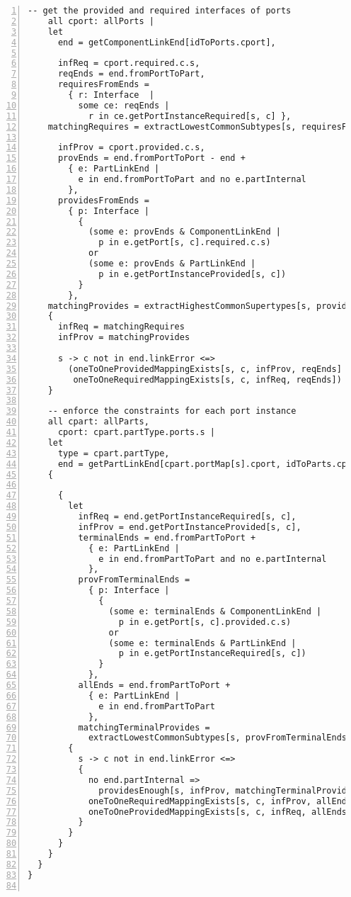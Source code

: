\begin{lstlisting}[caption={port\_inference.als}, numbers=left]
    -- get the provided and required interfaces of ports
    all cport: allPorts |
    let
      end = getComponentLinkEnd[idToPorts.cport],
      
      infReq = cport.required.c.s,
      reqEnds = end.fromPortToPart,
      requiresFromEnds =
        { r: Interface  |
          some ce: reqEnds |
            r in ce.getPortInstanceRequired[s, c] },
    matchingRequires = extractLowestCommonSubtypes[s, requiresFromEnds],
      
      infProv = cport.provided.c.s,
      provEnds = end.fromPortToPort - end +
        { e: PartLinkEnd |
          e in end.fromPortToPart and no e.partInternal
        },
      providesFromEnds =
        { p: Interface |
          {
            (some e: provEnds & ComponentLinkEnd |
              p in e.getPort[s, c].required.c.s)
            or
            (some e: provEnds & PartLinkEnd |
              p in e.getPortInstanceProvided[s, c])
          }
        },
    matchingProvides = extractHighestCommonSupertypes[s, providesFromEnds]
    {
      infReq = matchingRequires
      infProv = matchingProvides

      s -> c not in end.linkError <=>
        (oneToOneProvidedMappingExists[s, c, infProv, reqEnds] and
         oneToOneRequiredMappingExists[s, c, infReq, reqEnds])
    }

    -- enforce the constraints for each port instance
    all cpart: allParts,
      cport: cpart.partType.ports.s |
    let
      type = cpart.partType,
      end = getPartLinkEnd[cpart.portMap[s].cport, idToParts.cpart]
    {
      
      {
        let
          infReq = end.getPortInstanceRequired[s, c],        
          infProv = end.getPortInstanceProvided[s, c],
          terminalEnds = end.fromPartToPort +
            { e: PartLinkEnd |
              e in end.fromPartToPart and no e.partInternal
            },
          provFromTerminalEnds =
            { p: Interface |
              {
                (some e: terminalEnds & ComponentLinkEnd |
                  p in e.getPort[s, c].provided.c.s)
                or
                (some e: terminalEnds & PartLinkEnd |
                  p in e.getPortInstanceRequired[s, c])
              }
            },
          allEnds = end.fromPartToPort +
            { e: PartLinkEnd |
              e in end.fromPartToPart
            },
          matchingTerminalProvides =
            extractLowestCommonSubtypes[s, provFromTerminalEnds]
        {
          s -> c not in end.linkError <=>
          {
            no end.partInternal =>
              providesEnough[s, infProv, matchingTerminalProvides]
            oneToOneRequiredMappingExists[s, c, infProv, allEnds]
            oneToOneProvidedMappingExists[s, c, infReq, allEnds]
          }
        }
      }
    }
  }
}


\end{lstlisting}
